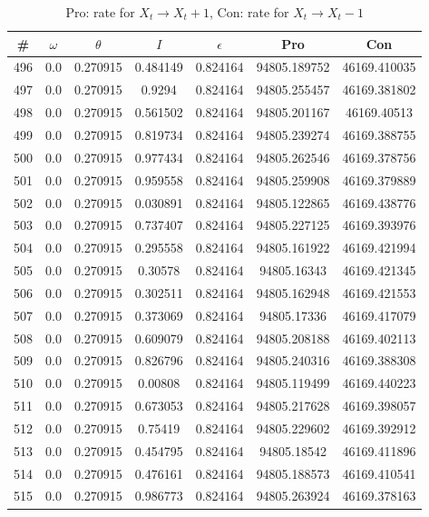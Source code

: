 \newpage
\begin{table}
\caption{Pro: rate for $X_t \rightarrow X_t + 1$, Con: rate for $X_t \rightarrow X_t - 1$}
\begin{tabular*}{\linewidth}{c|c|c|c|c|c|c}
\# & $\omega$ & $\theta$ & $I$ & $\epsilon$ & Pro & Con \\
\hline
496 & 0.0 & 0.270915 & 0.484149 & 0.824164 & 94805.189752 & 46169.410035\\
497 & 0.0 & 0.270915 & 0.9294 & 0.824164 & 94805.255457 & 46169.381802\\
498 & 0.0 & 0.270915 & 0.561502 & 0.824164 & 94805.201167 & 46169.40513\\
499 & 0.0 & 0.270915 & 0.819734 & 0.824164 & 94805.239274 & 46169.388755\\
500 & 0.0 & 0.270915 & 0.977434 & 0.824164 & 94805.262546 & 46169.378756\\
501 & 0.0 & 0.270915 & 0.959558 & 0.824164 & 94805.259908 & 46169.379889\\
502 & 0.0 & 0.270915 & 0.030891 & 0.824164 & 94805.122865 & 46169.438776\\
503 & 0.0 & 0.270915 & 0.737407 & 0.824164 & 94805.227125 & 46169.393976\\
504 & 0.0 & 0.270915 & 0.295558 & 0.824164 & 94805.161922 & 46169.421994\\
505 & 0.0 & 0.270915 & 0.30578 & 0.824164 & 94805.16343 & 46169.421345\\
506 & 0.0 & 0.270915 & 0.302511 & 0.824164 & 94805.162948 & 46169.421553\\
507 & 0.0 & 0.270915 & 0.373069 & 0.824164 & 94805.17336 & 46169.417079\\
508 & 0.0 & 0.270915 & 0.609079 & 0.824164 & 94805.208188 & 46169.402113\\
509 & 0.0 & 0.270915 & 0.826796 & 0.824164 & 94805.240316 & 46169.388308\\
510 & 0.0 & 0.270915 & 0.00808 & 0.824164 & 94805.119499 & 46169.440223\\
511 & 0.0 & 0.270915 & 0.673053 & 0.824164 & 94805.217628 & 46169.398057\\
512 & 0.0 & 0.270915 & 0.75419 & 0.824164 & 94805.229602 & 46169.392912\\
513 & 0.0 & 0.270915 & 0.454795 & 0.824164 & 94805.18542 & 46169.411896\\
514 & 0.0 & 0.270915 & 0.476161 & 0.824164 & 94805.188573 & 46169.410541\\
515 & 0.0 & 0.270915 & 0.986773 & 0.824164 & 94805.263924 & 46169.378163\\

\end{tabular*}
\end{table}
